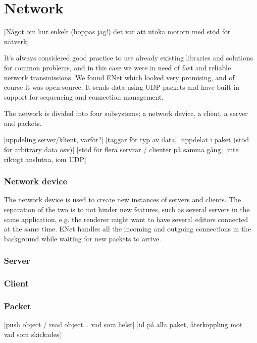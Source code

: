 \chapter{Network}
[Något om hur enkelt (hoppas jag!) det var att utöka motorn med stöd för nätverk]

It's always considered good practice to use already existing libraries and solutions for common problems, and in this case we were in need of fast and reliable network transmissions.
We found ENet which looked very promising, and of course it was open source. It sends data using UDP packets and have built in support for sequencing and connection management.

The network is divided into four subsystems; a network device, a client, a server and packets.

[uppdeling server/klient, varför?]
[taggar för typ av data]
[uppdelat i paket (stöd för arbitrary data osv)]
[stöd för flera servrar / clienter på samma gång]
[inte riktigt anslutna, iom UDP]
\subsection{Network device}
The network device is used to create new instances of servers and clients. The separation of the two is to not hinder new features, such as several servers in the same application, e.g. the renderer might want to have several editors connected at the same time.
ENet handles all the incoming and outgoing connections in the background while waiting for new packets to arrive. 
\subsection{Server}
\subsection{Client}
\subsection{Packet}
[push object / read object... vad som helst]
[id på alla paket, återkoppling mot vad som skickades]


